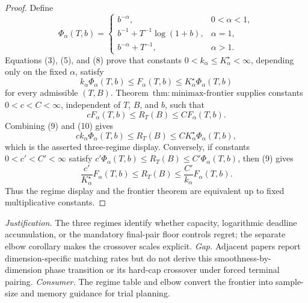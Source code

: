 \documentclass{article}
\begin{document}
\begin{proof}
Define
\[
\Phi_\alpha(T,b)=
\begin{cases}
b^{-\alpha},&0<\alpha<1,\\
b^{-1}+T^{-1}\log(1+b),&\alpha=1,\\
b^{-\alpha}+T^{-1},&\alpha>1.
\end{cases}
\]
Equations (3), (5), and (8) prove that constants \(0<k_\alpha\le K_\alpha^\star<\infty\), depending only on the fixed \(\alpha\), satisfy
\[
k_\alpha\Phi_\alpha(T,b)
\le F_\alpha(T,b)
\le K_\alpha^\star\Phi_\alpha(T,b) \tag{9}
\]
for every admissible \((T,B)\).  Theorem~\(\mathrm{thm:minimax\text{-}frontier}\) supplies constants \(0<c<C<\infty\), independent of \(T\), \(B\), and \(b\), such that
\[
cF_\alpha(T,b)\le R_T(B)\le CF_\alpha(T,b). \tag{10}
\]
Combining (9) and (10) gives
\[
ck_\alpha\Phi_\alpha(T,b)
\le R_T(B)
\le CK_\alpha^\star\Phi_\alpha(T,b), \tag{11}
\]
which is the asserted three-regime display.  Conversely, if constants \(0<c'<C'<\infty\) satisfy \(c'\Phi_\alpha(T,b)\le R_T(B)\le C'\Phi_\alpha(T,b)\), then (9) gives
\[
\frac{c'}{K_\alpha^\star}F_\alpha(T,b)
\le R_T(B)
\le \frac{C'}{k_\alpha}F_\alpha(T,b). \tag{12}
\]
Thus the regime display and the frontier theorem are equivalent up to fixed multiplicative constants.
\end{proof}
\par\smallskip\noindent \textit{Justification.} The three regimes identify whether capacity, logarithmic deadline accumulation, or the mandatory final-pair floor controls regret; the separate elbow corollary makes the crossover scales explicit. \textit{Gap.} Adjacent papers report dimension-specific matching rates but do not derive this smoothness-by-dimension phase transition or its hard-cap crossover under forced terminal pairing. \textit{Consumer.} The regime table and elbow convert the frontier into sample-size and memory guidance for trial planning.
\end{document}
